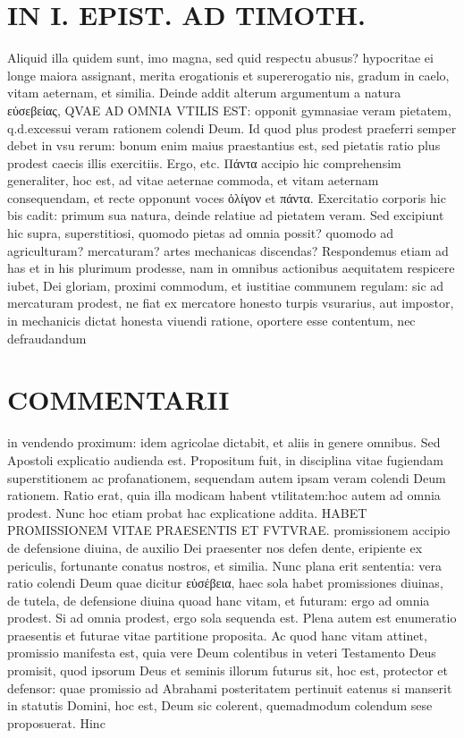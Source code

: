 \documentclass{article}
\begin{document}
\begin{pages}
\section*{IN I. EPIST. AD TIMOTH. }
\marginpar{[ p.99 ]}\pstart Aliquid illa quidem sunt, imo magna, sed quid respectu abusus? hypocritae ei longe maiora assignant, merita erogationis et supererogatio nis, gradum in caelo, vitam aeternam, et similia.  \pend\pstart Deinde addit alterum argumentum a natura εὐσεβείας, QVAE AD OMNIA VTILIS EST: opponit gymnasiae veram pietatem, q.d.excessui veram rationem colendi Deum. Id quod plus prodest praeferri semper debet in vsu rerum: bonum enim maius praestantius est, sed pietatis ratio plus prodest caecis illis exercitiis. Ergo, etc.  \pend\pstart Πάντα accipio hic comprehensim generaliter, hoc est, ad vitae aeternae commoda, et vitam aeternam consequendam, et recte opponunt voces ὀλίγον et πάντα. Exercitatio corporis hic bis cadit: primum sua natura, deinde relatiue ad pietatem veram. Sed excipiunt hic supra, superstitiosi, quomodo pietas ad omnia possit? quomodo ad agriculturam? mercaturam? artes mechanicas discendas? Respondemus etiam ad has et in his plurimum prodesse, nam in omnibus actionibus aequitatem respicere iubet, Dei gloriam, proximi commodum, et iustitiae communem regulam: sic ad mercaturam prodest, ne fiat ex mercatore honesto turpis vsurarius, aut impostor, in mechanicis dictat honesta viuendi ratione, oportere esse contentum, nec defraudandum  \pend
\section*{COMMENTARII }
\marginpar{[ p.100 ]}\pstart in vendendo proximum: idem agricolae dictabit, et aliis in genere omnibus. Sed Apostoli explicatio audienda est. Propositum fuit, in disciplina vitae fugiendam superstitionem ac profanationem, sequendam autem ipsam veram colendi Deum rationem. Ratio erat, quia illa modicam habent vtilitatem:hoc autem ad omnia prodest. Nunc hoc etiam probat hac explicatione addita. HABET PROMISSIONEM VITAE PRAESENTIS ET FVTVRAE. promissionem accipio de defensione diuina, de auxilio Dei praesenter nos defen dente, eripiente ex periculis, fortunante conatus nostros, et similia. Nunc plana erit sententia: vera ratio colendi Deum quae dicitur εὐσέβεια, haec sola habet promissiones diuinas, de tutela, de defensione diuina quoad hanc vitam, et futuram: ergo ad omnia prodest. Si ad omnia prodest, ergo sola sequenda est. Plena autem est enumeratio praesentis et futurae vitae partitione proposita. Ac quod hanc vitam attinet, promissio manifesta est, quia vere Deum colentibus in veteri Testamento Deus promisit, quod ipsorum Deus et seminis illorum futurus sit, hoc est, protector et defensor: quae promissio ad Abrahami posteritatem pertinuit eatenus si manserit in statutis Domini, hoc est, Deum sic colerent, quemadmodum colendum sese proposuerat. Hinc  \pend

\end{pages}
\end{document}
